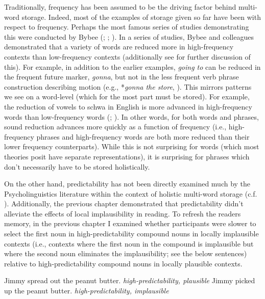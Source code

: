 \documentclass[
  12pt,
  letterpaper,
]{scrreport}
\begin{document}
Traditionally, frequency has been assumed to be the driving factor
behind multi-word storage. Indeed, most of the examples of storage given
so far have been with respect to frequency. Perhaps the most famous
series of studies demonstrating this were conducted by Bybee
(; ; ). In a series of studies, Bybee and colleagues
demonstrated that a variety of words are reduced more in high-frequency
contexts than low-frequency contexts (additionally see
 for further discussion of this). For example, in addition to the
earlier examples, \emph{going to} can be reduced in the frequent future
marker, \emph{gonna}, but not in the less frequent verb phrase
construction describing motion (e.g., *\emph{gonna the store},
). This mirrors patterns we see on
a word-level (which for the most part must be stored). For example, the
reduction of vowels to schwa in English is more advanced in
high-frequency words than low-frequency words
(;
). In other
words, for both words and phrases, sound reduction advances more quickly
as a function of frequency (i.e., high-frequency phrases and
high-frequency words are both more reduced than their lower frequency
counterparts). While this is not surprising for words (which most
theories posit have separate representations), it is surprising for
phrases which don't necessarily have to be stored holistically.

On the other hand, predictability has not been directly examined much by
the Psycholinguistics literature within the context of holistic
multi-word storage (c.f.
). Additionally, the previous chapter demonstrated that
predictability didn't alleviate the effects of local implausibility in
reading. To refresh the readers memory, in the previous chapter I
examined whether participants were slower to select the first noun in
high-predictability compound nouns in locally implausible contexts
(i.e., contexts where the first noun in the compound is implausible but
where the second noun eliminates the implausibility; see the below
sentences) relative to high-predictability compound nouns in locally
plausible contexts.

\begin{exe}
\ex
\begin{xlist}
\ex Jimmy spread out the peanut butter. \hfill \emph{high-predictability, plausible}
\ex Jimmy picked up the peanut butter. \hfill \emph{high-predictability, implausible}
\end{xlist}
\end{exe}
\end{document}
